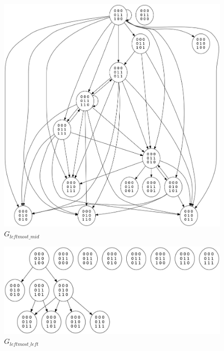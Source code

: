 \begin{figure}
  \includegraphics[scale=0.40]{body/images/graph_leftmost_mid.jpg}
  \caption{$G_{leftmost\_mid}$}
  \label{fig:graph_leftmost_mid}
\end{figure}

\begin{figure}
  \includegraphics[scale=0.40]{body/images/graph_leftmost_left.jpg}
  \caption{$G_{leftmost\_left}$}
  \label{fig:graph_leftmost_left}
\end{figure}
